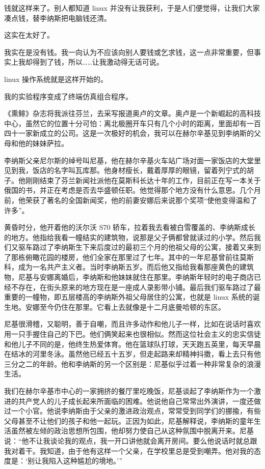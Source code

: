钱就这样来了。别人都知道 linux 并没有让我获利，于是人们便觉得，让我们大家凑点钱，替李纳斯把电脑钱还清。

这实在太好了。

我实在是没有钱。我一向认为不应该向别人要钱或乞求钱，这一点非常重要，但事实上我却得到了钱，所以……让我激动得无话可说。

linux 操作系统就是这样开始的。

我的实验程序变成了终端仿真组合程序。

 

《熏鲱》杂志将我派往芬兰，去采写报道奥卢的文章。奥卢是一个新崛起的高科技中心，虽然它的位置十分可怕：离北极圈开车只有几个小时的距离，里面却有一百四十一家新成立的公司。这是一次极好的机会，我可以在赫尔辛基见到李纳斯的父母和他的妹妹萨拉。

李纳斯父亲尼尔斯的绰号叫尼基，他在赫尔辛基火车站广场对面一家饭店的大堂里见到我，饭店的名字叫瓦库那。他身材瘦长，戴着厚厚的眼镜，留着列宁式的胡子。他刚刚结束了芬兰新闻社派他在莫斯科长达十年的工作，目前正在写一本关于俄国的书，并正在考虑是否去华盛顿任职。他觉得那个地方没有什么意思。几个月前，他荣获了著名的全国新闻奖，他的前妻安娜后来说那个奖项“使他变得温和了许多”。

黄昏时分，他开着他的沃尔沃 S70 轿车，拉着我去看被白雪覆盖的、李纳斯成长的地方。他指给我看一幢结实的建筑物，说那是父子俩都曾就读过的小学。然后我们又驱车路过了李纳斯生下来后度过的最初三个月的他祖父母的公寓，接着又来到了那栋俯瞰花园的楼房，他们全家在那里过了七年。其中的一年尼基曾前往莫斯科，成为一名共产主义者。当时李纳斯五岁。而后他又指给我看那座黄色的建筑物，尼基与安娜离婚后，李纳斯和他妹妹就住在那里。李纳斯年轻时的电子商店已经不存在，在街头原来的地方现在是一座成人录影带小铺。最后我们驱车路过了最重要的一幢物，即五层楼高的李纳斯外祖父母居住的公寓，也就是 linux 系统的诞生地。安娜至今仍住在那里。它看上去就像是十二月底曼哈顿的东区。

尼基很滑稽，又聪明，善于自嘲，而且许多动作和他儿子一样，比如在说话时喜欢用一只手握住自己的下巴。他们俩笑起来也很相似。然而这位社会主义的忠实信徒和他儿子不同的是，他终生热爱体育。他在篮球队打球，天天跑五英里，每天早晨在结冰的河里冬泳。虽然他已经五十五岁，但走起路来却精神抖擞，看上去只有他三分之二的年龄。他和李纳斯的另一个区别是：尼基似乎过着一种非常复杂的浪漫生活。

我们在赫尔辛基市中心的一家拥挤的餐厅里吃晚饭，尼基谈起了李纳斯作为一个激进的共产党人的儿子成长起来所面临的困难。他说他自己常常出外演讲，一度还做过一个小官。他说李纳斯由于父亲的激进政治观点，常常受到同学们的挪揄，有些父母甚至不让他们的孩子和他一起玩。正因为如此，尼基解释说，李纳斯的童年生活虽然被左倾的政治思想所包围，他却努力使自己从这种氛围中脱离开来。尼基说：“他不让我谈论我的观点，我一开口讲他就会离开房间。要么他说话时就总跟我对着干。我知道，由于他有这样一个父亲，在学校里总是受到嘲弄。他对我的态度是：‘别让我陷入这种尴尬的境地。’”

